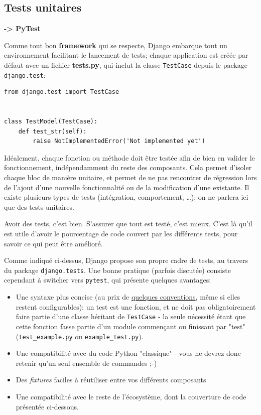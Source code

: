 \documentclass[11pt]{amsbook}
\begin{document}
\hypertarget{x-tests-unitaires}{\subsection{Tests unitaires}}
\textbf{-> PyTest}


Comme tout bon \textbf{framework} qui se respecte, Django embarque tout un environnement facilitant le lancement de tests; chaque application est créée par défaut avec un fichier \textbf{tests.py}, qui inclut la classe \texttt{TestCase} depuis le package \texttt{django.test}:


\begin{verbatim}
from django.test import TestCase


class TestModel(TestCase):
    def test_str(self):
        raise NotImplementedError('Not implemented yet')
\end{verbatim}

Idéalement, chaque fonction ou méthode doit être testée afin de bien en valider le fonctionnement, indépendamment du reste des composants. Cela permet d’isoler chaque bloc de manière unitaire, et permet de ne pas rencontrer de régression lors de l’ajout d’une nouvelle fonctionnalité ou de la modification d’une existante.
Il existe plusieurs types de tests (intégration, comportement, …​); on ne parlera ici que des tests unitaires.


Avoir des tests, c’est bien.
S’assurer que tout est testé, c’est mieux.
C’est là qu’il est utile d’avoir le pourcentage de code couvert par les différents tests, pour savoir ce qui peut être amélioré.


Comme indiqué ci-dessus, Django propose son propre cadre de tests, au travers du package \texttt{django.tests}.
Une bonne pratique (parfois discutée) consiste cependant à switcher vers \texttt{pytest}, qui présente quelques avantages:


\begin{itemize}

\item Une syntaxe plus concise (au prix de \href{https://docs.pytest.org/en/reorganize-docs/new-docs/user/naming_conventions.html}{quelques conventions}, même si elles restent configurables): un test est une fonction, et ne doit pas obligatoirement faire partie d’une classe héritant de \texttt{TestCase} - la seule nécessité étant que cette fonction fasse partie d’un module commençant ou finissant par "test" (\texttt{test\_example.py} ou \texttt{example\_test.py}).

\item Une compatibilité avec du code Python "classique" - vous ne devrez donc retenir qu’un seul ensemble de commandes ;-)

\item Des \emph{fixtures} faciles à réutiliser entre vos différents composants

\item Une compatibilité avec le reste de l’écosystème, dont la couverture de code présentée ci-dessous.

\end{itemize}
\end{document}
